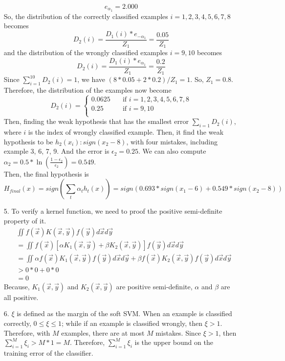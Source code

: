 \documentclass[11pt]{article}
\begin{document}
\begin{itemize}
\begin{equation*}
e_{\alpha_1} = 2.000
\end{equation*}
So, the distribution of the correctly classified examples \(i=1,2,3,4,5,6,7,8\) becomes
\begin{equation*}
D_2(i) = \frac{D_1(i) *e_{-\alpha_1} }{Z_1} = \frac{0.05}{Z_1}
\end{equation*}
and the distribution of the wrongly classified examples \(i=9,10\) becomes
\begin{equation*}
D_2(i) = \frac{D_1(i) *e_{\alpha_1} }{Z_1} = \frac{0.2}{Z_1}
\end{equation*}
Since \(\sum_{i=1}^{10} D_2(i) = 1\), we have \((8*0.05+2*0.2)/Z_1=1\). So, \(Z_1 = 0.8\). Therefore, the distribution of the examples now become
\begin{equation*}
D_2(i) =
  \begin{cases}
    0.0625       & \quad \text{if } i=1,2,3,4,5,6,7,8\\
    0.25           & \quad \text{if } i=9,10\\
  \end{cases}
\end{equation*}
Then, finding the weak hypothesis that has the smallest error \(\sum_{i=1} D_2(i)\), where \(i\) is the index of wrongly classified example. Then, it find the weak hypothesis to be \(h_2(x_i): sign(x_2-8)\), with four mistakes, including example 3, 6, 7, 9. And the error is \(\epsilon_2 = 0.25\). We can also compute \(\alpha_2 = 0.5 * \ln (\frac{1-\epsilon_2}{\epsilon_2}) = 0.549 \). \\
Then, the final hypothesis is 
\begin{equation*}
H_{final}(x) = sign(\sum_{t} \alpha_t h_t(x)) = sign(0.693*sign(x_1-6) + 0.549*sign(x_2-8))
\end{equation*}
\item[5.] To verify a kernel function, we need to proof the positive semi-definite property of it.
\begin{align*}
& \iint f(\vec{x})K(\vec{x},\vec{y})f(\vec{y})d\vec{x}d\vec{y} \\
& =\iint f(\vec{x})[\alpha K_1(\vec{x},\vec{y})+\beta K_2(\vec{x},\vec{y})]f(\vec{y})d\vec{x}d\vec{y} \\
& = \iint \alpha f(\vec{x})K_1(\vec{x},\vec{y})f(\vec{y})d\vec{x}d\vec{y} + \beta f(\vec{x})K_2(\vec{x},\vec{y})f(\vec{y})d\vec{x}d\vec{y} \\
& > 0*0 + 0*0 \\
& = 0
\end{align*}
Because, \(K_1(\vec{x},\vec{y})\) and \(K_2(\vec{x},\vec{y})\) are positive semi-definite, \(\alpha\) and \(\beta\) are all positive.
\item[6.] \(\xi\) is defined as the margin of the soft SVM. When an example is classified correctly, \(0 \leq \xi \leq 1\); while if an example is classified wrongly, then \(\xi > 1\). Therefore, with \(M\) examples, there are at most \(M\) mistakes. Since  \(\xi > 1\), then \(\sum_{i=1}^{M} \xi_i > M*1 = M\). Therefore, \(\sum_{i=1}^{M} \xi_i\) is the upper bound on the training error of the classifier.
\end{itemize}
\end{document}
